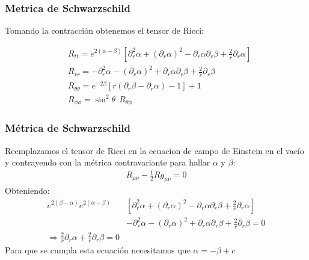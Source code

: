 \documentclass{beamer}
\begin{document}
\begin{frame}
\frametitle{Metrica de Schwarzschild}

Tomando la contracción obtenemos el tensor de Ricci: 

\begin{align*}
  &R_{t t}=e^{2(\alpha-\beta)}\left[\partial_r^2 \alpha+\left(\partial_r \alpha\right)^2-\partial_r \alpha \partial_r \beta+\frac{2}{r} \partial_r \alpha\right] \\
  &R_{r r}=-\partial_r^2 \alpha-\left(\partial_r \alpha\right)^2+\partial_r \alpha \partial_r \beta+\frac{2}{r} \partial_r \beta \\
  &R_{\theta \theta}=e^{-2 \beta}\left[r\left(\partial_r \beta-\partial_r \alpha\right)-1\right]+1 \\
  &R_{\phi \phi}=\sin ^2 \theta \ \ R_{\theta \phi}
\end{align*}


\end{frame}




\begin{frame}
\frametitle{Métrica de Schwarzschild}
Reemplazamos el tensor de Ricci en la ecuacion de campo de Einstein en el vacío y contrayendo con la métrica contravariante para hallar $ \alpha  $ y $ \beta  $: 
\begin{gather*}
  R _{\mu \nu }  - \frac{1}{2} R g _{\mu \nu }  = 0  
\end{gather*}
Obteniendo: 
\begin{align*}
  e ^ {2 (\beta - \alpha )} e ^ {2 (\alpha - \beta )} &\left[\partial_r^2 \alpha + (\partial_r \alpha )^2 - \partial_r \alpha \partial_r \beta + \frac{2 }{r } \partial_r \alpha \right] \\ 
  &- \partial_r^2 \alpha - (\partial_r \alpha)^2 + \partial_r \alpha \partial_r \beta + \frac{2}{r} \partial_r \beta = 0 \\ 
  \Longrightarrow \frac{2 }{r } \partial_r \alpha + \frac{2 }{r } \partial_r \beta = 0 
\end{align*}
Para que se cumpla esta ecuación necesitamos que $ \alpha = - \beta + c  $
\end{frame}


\end{document}
